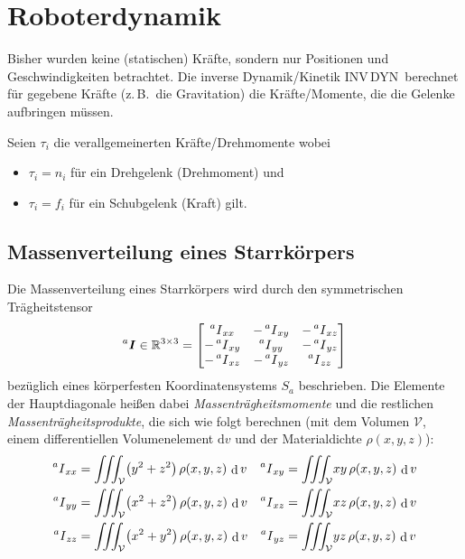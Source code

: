 \documentclass[a4paper, 11pt, accentcolor = tud3b]{tudreport}
\DeclareMathOperator{\total}{d}
\newcommand{\dif}[1]{\,\total#1}
\newcommand{\R}{\mathbb{R}}
\newcommand{\inreferenceto}[2]{\prescript{#1}{}{#2}}
\newcommand{\mat}[1]{\boldsymbol{#1}}
\newcommand{\zB}{z.\,B.~}
\newcommand{\INVDYN}{INV\,DYN~}
\begin{document}
	\chapter{Roboterdynamik}
		Bisher wurden keine (statischen) Kräfte, sondern nur Positionen und Geschwindigkeiten betrachtet. Die inverse Dynamik/Kinetik \INVDYN berechnet für gegebene Kräfte (\zB die Gravitation) die Kräfte/Momente, die die Gelenke aufbringen müssen.
		
		Seien \( \tau_i \) die verallgemeinerten Kräfte/Drehmomente wobei
		\begin{itemize}
			\item \( \tau_i = n_i \) für ein Drehgelenk (Drehmoment) und
			\item \( \tau_i = f_i \) für ein Schubgelenk (Kraft) gilt.
		\end{itemize}

		\section{Massenverteilung eines Starrkörpers}
			Die Massenverteilung eines Starrkörpers wird durch den symmetrischen Trägheitstensor
			\begin{equation*}
				\inreferenceto{a}{\mat{I}} \in \R^{3 \times 3} =
					\begin{bmatrix}
						\inreferenceto{a}{I}_{xx}  & -\inreferenceto{a}{I}_{xy} & -\inreferenceto{a}{I}_{xz} \\
						-\inreferenceto{a}{I}_{xy} & \inreferenceto{a}{I}_{yy}  & -\inreferenceto{a}{I}_{yz} \\
						-\inreferenceto{a}{I}_{xz} & -\inreferenceto{a}{I}_{yz} & \inreferenceto{a}{I}_{zz}
					\end{bmatrix}
			\end{equation*}
			bezüglich eines körperfesten Koordinatensystems \(S_a\) beschrieben. Die Elemente der Hauptdiagonale heißen dabei \emph{Massenträgheitsmomente} und die restlichen \emph{Massenträgheitsprodukte}, die sich wie folgt berechnen (mit dem Volumen \(\mathcal{V}\), einem differentiellen Volumenelement \( \text{d}v \) und der Materialdichte \( \rho(x, y, z) \)):
			\begin{align*}
				\inreferenceto{a}{I}_{xx} &= \iiint_{\mathcal{V}} \! \big(y^2 + z^2\big) \,\rho(x, y, z) \dif{v} & \inreferenceto{a}{I}_{xy} &= \iiint_{\mathcal{V}} \! xy \,\rho(x, y, z) \dif{v} \\
				\inreferenceto{a}{I}_{yy} &= \iiint_{\mathcal{V}} \! \big(x^2 + z^2\big) \,\rho(x, y, z) \dif{v} & \inreferenceto{a}{I}_{xz} &= \iiint_{\mathcal{V}} \! xz \,\rho(x, y, z) \dif{v} \\
				\inreferenceto{a}{I}_{zz} &= \iiint_{\mathcal{V}} \! \big(x^2 + y^2\big) \,\rho(x, y, z) \dif{v} & \inreferenceto{a}{I}_{yz} &= \iiint_{\mathcal{V}} \! yz \,\rho(x, y, z) \dif{v}
			\end{align*}
			
\end{document}
